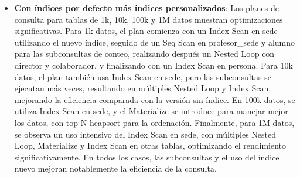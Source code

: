 \begin{itemize}
\begin{itemize}
		      \item {\textbf{Con índices por defecto más índices personalizados}: Los planes de consulta para tablas de 1k, 10k, 100k y 1M datos muestran optimizaciones significativas. Para 1k datos, el plan comienza con un Index Scan en sede utilizando el nuevo índice, seguido de un Seq Scan en profesor\_sede y alumno para las subconsultas de conteo, realizando después un Nested Loop con director y colaborador, y finalizando con un Index Scan en persona. Para 10k datos, el plan también usa Index Scan en sede, pero las subconsultas se ejecutan más veces, resultando en múltiples Nested Loop y Index Scan, mejorando la eficiencia comparada con la versión sin índice. En 100k datos, se utiliza Index Scan en sede, y el Materialize se introduce para manejar mejor los datos, con top-N heapsort para la ordenación. Finalmente, para 1M datos, se observa un uso intensivo del Index Scan en sede, con múltiples Nested Loop, Materialize y Index Scan en otras tablas, optimizando el rendimiento significativamente. En todos los casos, las subconsultas y el uso del índice nuevo mejoran notablemente la eficiencia de la consulta.}
	      \end{itemize}
\end{itemize}
